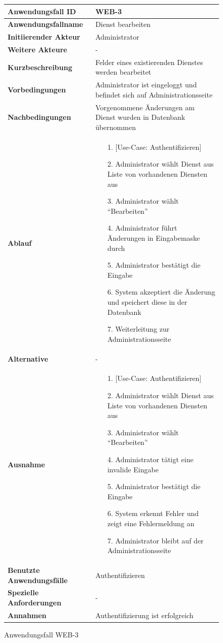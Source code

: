 \begin{figure}[h]
	\centering
	\begin{tabularx}{\textwidth}{ X | X }
		\textbf{Anwendungsfall ID} & WEB-3 \\ \hline
		\textbf{Anwendungsfallname} & Dienst bearbeiten \\ \hline
		\textbf{Initiierender Akteur} & Administrator \\ \hline
		\textbf{Weitere Akteure} & - \\ \hline
		\textbf{Kurzbeschreibung} & Felder eines existierenden Dienstes werden bearbeitet \\ \hline
		\textbf{Vorbedingungen} & Administrator ist eingeloggt und befindet sich auf Administrationsseite \\ \hline
		\textbf{Nachbedingungen} & Vorgenommene Änderungen am Dienst wurden in Datenbank übernommen \\ \hline
		\textbf{Ablauf} &
		\begin{enumerate}
			\item [1.] [Use-Case: Authentifizieren]
			\item [2.] Administrator wählt Dienst aus Liste von vorhandenen Diensten aus
			\item [3.] Administrator wählt ``Bearbeiten''
			\item [4.] Administrator führt Änderungen in Eingabemaske durch
			\item [5.] Administrator bestätigt die Eingabe
			\item [6.] System akzeptiert die Änderung und speichert diese in der Datenbank
			\item [7.] Weiterleitung zur Administrationsseite
		\end{enumerate} \\ \hline
		\textbf{Alternative} & - \\ \hline
		\textbf{Ausnahme} &
		\begin{enumerate}
			\item [1.] [Use-Case: Authentifizieren]
			\item [2.] Administrator wählt Dienst aus Liste von vorhandenen Diensten aus
			\item [3.] Administrator wählt ``Bearbeiten''
			\item [4.] Administrator tätigt eine invalide Eingabe
			\item [5.] Administrator bestätigt die Eingabe
			\item [6.] System erkennt Fehler und zeigt eine Fehlermeldung an
			\item [7.] Administrator bleibt auf der Administrationsseite
		\end{enumerate}  \\ \hline
		\textbf{Benutzte Anwendungsfälle} & Authentifizieren \\ \hline
		\textbf{Spezielle Anforderungen} & - \\ \hline
		\textbf{Annahmen} & Authentifizierung ist erfolgreich
	\end{tabularx}
	\caption{Anwendungsfall WEB-3}
	\label{fig:anwendungsfall-server-tabelle-web-3}
\end{figure}

